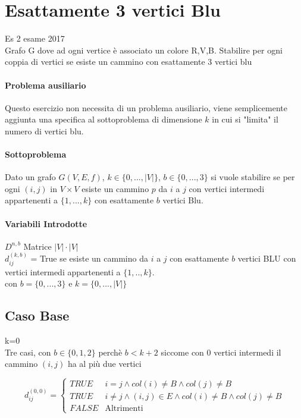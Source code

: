 \documentclass[12pt, a4paper, openany]{book}
\begin{document}
\section{Esattamente 3 vertici Blu} Es 2 esame 2017\\
Grafo G dove ad ogni vertice è associato un colore {R,V,B}. Stabilire per ogni coppia di vertici se esiste un cammino con esattamente 3 vertici blu

\paragraph*{Problema ausiliario}
Questo esercizio non necessita di un problema ausiliario, viene semplicemente aggiunta una specifica al sottoproblema di dimensione $k$ in cui si "limita" il numero di vertici blu.

\paragraph*{Sottoproblema}
Dato un grafo $G(V,E,f)$, $k\in\{0,...,|V|\}$, $b\in \{0,...,3\}$ si vuole stabilire se per ogni $(i,j)$ in $V \times V$ esiste un cammino $p$ da $i$ a $j$ con vertici intermedi
appartenenti a $\{1,...,k\}$ con esattamente $b$ vertici Blu.

\paragraph*{Variabili Introdotte}
$D^{n,b}$ Matrice $|V|\cdot|V|$\\
$d^{(k,b)}_{ij}$ = True se esiste un cammino da $i$ a $j$ con esattamente $b$ vertici BLU con vertici intermedi appartenenti a $\{1,..,k\}$.\\
con $b = \{0,...,3\}$ e $k=\{0,...,|V|\}$

\subsection*{Caso Base} k=0\\
Tre casi, con $b \in \{0,1,2\}$ perchè $b < k+2$ siccome con 0 vertici intermedi il cammino $(i,j)$ ha al più due vertici

\begin{equation*}
	d_{ij}^{(0,0)} = \begin{cases}
		TRUE  & i=j\land col(i)\neq B\land col(j)\neq B                      \\
		TRUE  & i\neq j\land (i,j)\in E \land col(i)\neq B\land col(j)\neq B \\
		FALSE & \text{Altrimenti}
	\end{cases}
\end{equation*}
\end{document}
